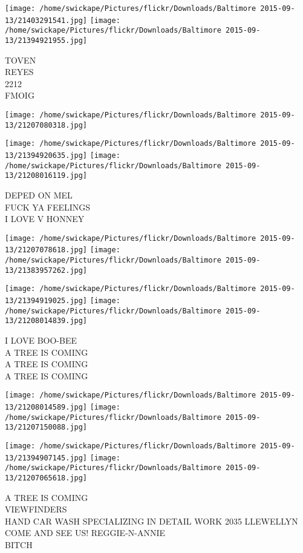 \documentclass[10pt,letterpaper]{article}
\begin{document}
\texttt{[image: /home/swickape/Pictures/flickr/Downloads/Baltimore 2015-09-13/21403291541.jpg]}
\texttt{[image: /home/swickape/Pictures/flickr/Downloads/Baltimore 2015-09-13/21394921955.jpg]}

TOVEN\\
REYES\\
2212\\
FMOIG\\
\pagebreak

\texttt{[image: /home/swickape/Pictures/flickr/Downloads/Baltimore 2015-09-13/21207080318.jpg]}

\vspace{0.25in}
\texttt{[image: /home/swickape/Pictures/flickr/Downloads/Baltimore 2015-09-13/21394920635.jpg]}
\texttt{[image: /home/swickape/Pictures/flickr/Downloads/Baltimore 2015-09-13/21208016119.jpg]}

DEPED ON MEL\\
FUCK YA FEELINGS\\
I LOVE V HONNEY\\
\pagebreak

\texttt{[image: /home/swickape/Pictures/flickr/Downloads/Baltimore 2015-09-13/21207078618.jpg]}
\texttt{[image: /home/swickape/Pictures/flickr/Downloads/Baltimore 2015-09-13/21383957262.jpg]}

\texttt{[image: /home/swickape/Pictures/flickr/Downloads/Baltimore 2015-09-13/21394919025.jpg]}
\texttt{[image: /home/swickape/Pictures/flickr/Downloads/Baltimore 2015-09-13/21208014839.jpg]}

I LOVE BOO{-}BEE\\
A TREE IS COMING\\
A TREE IS COMING\\
A TREE IS COMING\\
\pagebreak

\texttt{[image: /home/swickape/Pictures/flickr/Downloads/Baltimore 2015-09-13/21208014589.jpg]}
\texttt{[image: /home/swickape/Pictures/flickr/Downloads/Baltimore 2015-09-13/21207150088.jpg]}

\texttt{[image: /home/swickape/Pictures/flickr/Downloads/Baltimore 2015-09-13/21394907145.jpg]}
\texttt{[image: /home/swickape/Pictures/flickr/Downloads/Baltimore 2015-09-13/21207065618.jpg]}

A TREE IS COMING\\
VIEWFINDERS\\
HAND CAR WASH SPECIALIZING IN DETAIL WORK 2035 LLEWELLYN COME AND SEE US!  REGGIE{-}N{-}ANNIE\\
BITCH\\
\pagebreak
\end{document}
